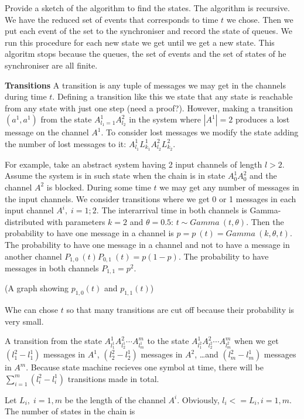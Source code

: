     Provide a sketch of the algorithm to find the states. The algorithm is recursive. We have the reduced set of events that corresponds to time $t$ we chose. Then we put each event of the set to the synchroniser and record the state of queues. We run this procedure for each new state we get until we get a new state. This algoritm stops because the queues, the set of events and the set of states of he synchroniser are all finite.


\textbf{Transitions}
A transition is any tuple of messages we may get in the channels during time $t$. Defining a transition like this we state that any state is reachable from any state with just one step (need a proof?).
However, making a transition $(a^1,a^1)$ from the state $A^1_{l_1=1} A^2_{l_2}$ in the system where $|A^1|=2$ produces a lost message on the channel $A^1$. To consider lost messages we modify the state adding the number of lost messages to it: $A^1_{l_1} L^1_{k_1} A^2_{l_2} L^2_{k_2}$.

For example, take an abstract system having 2 input channels of length $l>2$. Assume the system is in such state when the chain is in state $A^1_0 A^2_0$ and the channel $A^2$ is blocked. During some time $t$ we may get any number of messages in the input channels. We consider transitions where we get 0 or 1 messages in each input channel $A^i, \; i={1;2}$. The interarrival time in both channels is Gamma-distributed with parameters $k=2$ and $\theta=0.5$: $t \sim Gamma \: (t,\theta)$. Then the probability to have one message in a channel is $p = p\:(t) = Gamma \:(k,\theta,t)$. The probability to have one message in a channel and not to have a message in another channel $P_{1,0} \: (t) P_{0,1} \: (t) = p(1-p)$. The probability to have messages in both channels $P_{1,1} = p^2$.

(A graph showing $p_{1,0}(t)$ and $p_{1,1}(t)$)

Whe can chose $t$ so that many transitions are cut off because their probability is very small.



A transition from the state $A^1_{l^1_1} A^2_{l^1_2} \cdots A^m_{l^1_m}$ to the state $A^1_{l^2_1} A^2_{l^2_2} \cdots A^m_{l^2_m}$ when we get $(l^2_1-l^1_1)$ messages in $A^1$, $(l^2_2-l^1_2)$ messages in $A^2$, \dots and $(l^2_m-l^1_m)$ messages in $A^m$. Because state machine recieves one symbol at time, there will be $\sum_{i=1}^{m}{(l^2_i-l^1_i)}$ transitions made in total.


Let $L_i, \; i=1,m$ be the length of the channel $A^i$. Obviously, $l_i <= L_i, i=1,m$. The number of states in the chain is


